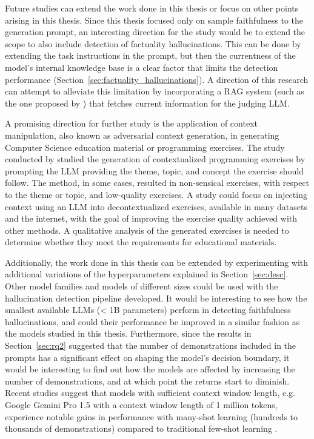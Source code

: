 \documentclass[english, 12pt, a4paper, sci, utf8, a-2b, online]{latex/definitions/aaltothesis}
\begin{document}
Future studies can extend the work done in this thesis or focus on other points arising in this thesis. Since this thesis focused only on sample faithfulness to the generation prompt, an interesting direction for the study would be to extend the scope to also include detection of factuality hallucinations. This can be done by extending the task instructions in the prompt, but then the currentness of the model's internal knowledge base is a clear factor that limits the detection performance (Section~\ref{sec:factuality_hallucinations}). A direction of this research can attempt to alleviate this limitation by incorporating a RAG system (such as the one proposed by \textcite{ram2023incontextretrievalaugmentedlanguagemodels}) that fetches current information for the judging LLM.

A promising direction for further study is the application of context manipulation, also known as adversarial context generation, in generating Computer Science education material or programming exercises. The study conducted by \textcite{10.1145/3632620.3671103} studied the generation of contextualized programming exercises by prompting the LLM providing the theme, topic, and concept the exercise should follow. The method, in some cases, resulted in non-sensical exercises, with respect to the theme or topic, and low-quality exercises. A study could focus on injecting context using an LLM into decontextualized exercises, available in many datasets and the internet, with the goal of improving the exercise quality achieved with other methods. A qualitative analysis of the generated exercises is needed to determine whether they meet the requirements for educational materials.

Additionally, the work done in this thesis can be extended by experimenting with additional variations of the hyperparameters explained in Section~\ref{sec:desc}. Other model families and models of different sizes could be used with the  hallucination detection pipeline developed. It would be interesting to see how the smallest available LLMs (< 1B parameters) perform in detecting faithfulness hallucinations, and could their performance be improved in a similar fashion as the models studied in this thesis. Furthermore, since the results in Section~\ref{sec:rq2} suggested that the number of demonstrations included in the prompts has a significant effect on shaping the model's decision boundary, it would be interesting to find out how the models are affected by increasing the number of demonstrations, and at which point the returns start to diminish. Recent studies suggest that models with sufficient context window length, e.g. Google Gemini Pro 1.5 \cite{geminiteam2024gemini15unlockingmultimodal} with a context window length of 1 million tokens, experience notable gains in performance with many-shot learning (hundreds to thousands of demonstrations) compared to traditional few-shot learning \cite{agarwal2024manyshotincontextlearning}.
\end{document}
